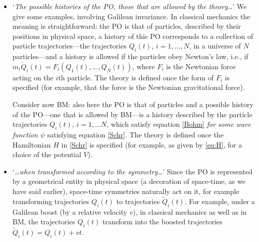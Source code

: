 \documentclass[12pt]{article}
\begin{document}
\begin{itemize}
\item `{\em The possible histories of the PO, those that are allowed by the theory\ldots}'
{We give some examples, involving Galilean %
invariance.} In classical mechanics the meaning {is} straightforward: the PO is that of particles, described by their positions in  physical space, {a history of this PO corresponds to a collection of particle trajectories---the trajectories  $Q_i(t)$, $i=1, \ldots ,N$, in 
a universe  of $N$ particles---and a history
is allowed if the particles obey Newton's law, i.e., if} $m_i \ddot Q_i(t) = F_i (Q_1(t), ..., Q_N(t))$, where $F_i$ is the Newtonian force acting on the $i$th particle. The theory is defined once the
form of  $F_i$ is specified (for example, that the force is the Newtonian gravitational force).

Consider now {\sf BM}: also here the PO is that of particles  and a possible history of the PO---one that is allowed by {\sf BM}---is a history described by  the particle trajectories 
$Q_i(t)$, $i=1, \ldots N$, which satisfy equation \eqref{Bohm} {\em for some wave function $\psi$}  satisfying  equation \eqref{Schr}. The theory is defined once the Hamiltonian $H$ in  \eqref{Schr} is specified (for example, as given by \eqref{eq:H}, for a choice of the potential $V$).

\item `{\em \ldots when transformed according to the symmetry\ldots}' 
Since the PO is represented by
a geometrical entity in physical space (a decoration of space-time, as we have said earlier), space-time symmetries naturally act on it, for example 
transforming trajectories $Q_i(t)$ to trajectories $\tilde{Q}_i(t)$. {For example,} 
under a Galilean boost (by a relative velocity $v$), in classical mechanics as well as in {\sf BM}, the trajectories $Q_i(t)$ transform into the boosted trajectories $\tilde{Q}_i(t) = Q_i(t) + v t$.


\end{itemize}
\end{document}
